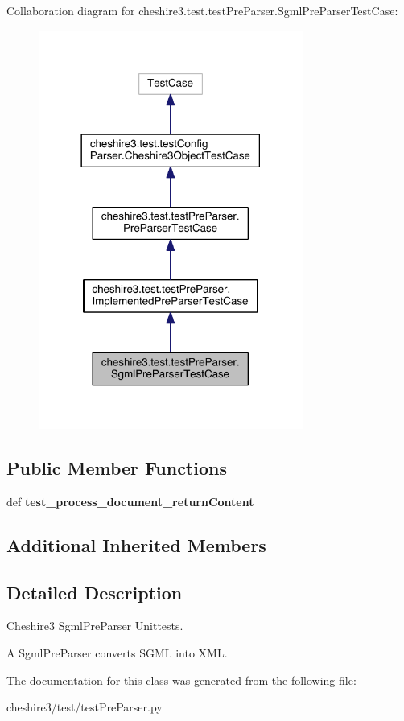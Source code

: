 Collaboration diagram for cheshire3.\-test.\-test\-Pre\-Parser.\-Sgml\-Pre\-Parser\-Test\-Case\-:
\nopagebreak
\begin{figure}[H]
\begin{center}
\leavevmode
\includegraphics[width=246pt]{classcheshire3_1_1test_1_1test_pre_parser_1_1_sgml_pre_parser_test_case__coll__graph}
\end{center}
\end{figure}
\subsection*{Public Member Functions}
\begin{DoxyCompactItemize}
\item 
\hypertarget{classcheshire3_1_1test_1_1test_pre_parser_1_1_sgml_pre_parser_test_case_a07a5219a79af24fa43b644cc672a2d50}{def {\bfseries test\-\_\-process\-\_\-document\-\_\-return\-Content}}\label{classcheshire3_1_1test_1_1test_pre_parser_1_1_sgml_pre_parser_test_case_a07a5219a79af24fa43b644cc672a2d50}

\end{DoxyCompactItemize}
\subsection*{Additional Inherited Members}


\subsection{Detailed Description}
\begin{DoxyVerb}Cheshire3 SgmlPreParser Unittests.

A SgmlPreParser converts SGML into XML.
\end{DoxyVerb}
 

The documentation for this class was generated from the following file\-:\begin{DoxyCompactItemize}
\item 
cheshire3/test/test\-Pre\-Parser.\-py\end{DoxyCompactItemize}
